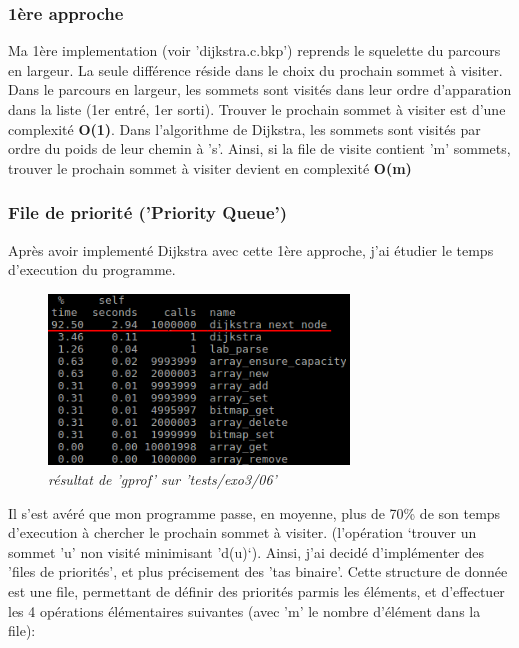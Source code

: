\documentclass[a4paper,10pt]{article}
\begin{document}
    \subsubsection{1ère approche}
      Ma 1ère implementation (voir 'dijkstra.c.bkp') reprends le squelette du parcours en largeur.
      La seule différence réside dans le choix du prochain sommet à visiter.\newline
      Dans le parcours en largeur, les sommets sont visités dans leur ordre d'apparation dans la liste (1er entré, 1er sorti).
      Trouver le prochain sommet à visiter est d'une complexité \textbf{O(1)}.\newline\newline
      Dans l'algorithme de Dijkstra, les sommets sont visités par ordre du poids de leur chemin à 's'.
      Ainsi, si la file de visite contient 'm' sommets, trouver le prochain sommet à visiter devient en complexité \textbf{O(m)}
      
    \subsubsection{File de priorité ('Priority Queue')}
      Après avoir implementé Dijkstra avec cette 1ère approche, j'ai étudier le temps d'execution du programme.\newline
     \begin{figure}
	\begin{center}
	  \includegraphics[width=8cm,height=\textheight,keepaspectratio]{./images/no_pqueue.png}
	\end{center}
	\caption{\textit{résultat de 'gprof' sur 'tests/exo3/06'}}
      \end{figure}
      Il s'est avéré que mon programme passe, en moyenne, plus de 70\% de son temps d'execution à chercher le prochain sommet à visiter.
      (l'opération `trouver un sommet 'u' non visité minimisant 'd(u)`).\newline\newline
      Ainsi, j'ai decidé d'implémenter des 'files de priorités', et plus précisement des 'tas binaire'.
      Cette structure de donnée est une file, permettant de définir des priorités parmis les éléments,
      et d'effectuer les 4 opérations élémentaires suivantes (avec 'm' le nombre d'élément dans la file):
      
\end{document}
